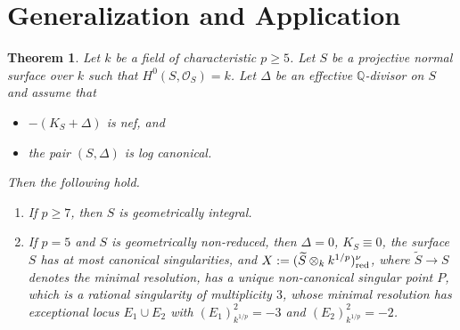 \documentclass[reqno,oneside]{amsart}
\newtheorem{theorem}{Theorem}[section]
\theoremstyle{definition}
\theoremstyle{plain}
\numberwithin{equation}{section}
\begin{document}
\section{Generalization and Application}\label{section-application}
\begin{theorem}\label{theorem-geo-int-log-pair}
  Let $k$ be a field of characteristic $p\ge 5$.
  Let $S$ be a projective normal surface over $k$ such that $H^0(S,\mathcal{O}_S) = k$.
  Let $\Delta$ be an effective $\mathbb Q$-divisor on $S$ and assume that
  \begin{itemize}
    \item $-(K_S + \Delta)$ is nef, and
    \item the pair $(S,\Delta)$ is log canonical.
  \end{itemize}
  Then the following hold.
  \begin{enumerate}[\rm(1)]
    \item If $p\ge7$, then $S$ is geometrically integral.
    \item If $p=5$ and $S$ is geometrically non-reduced, then $\Delta=0$, $K_S\equiv 0$, the surface $S$ has at most canonical singularities, and $X:=(\widetilde S\otimes_{k} k^{1/p})_{\rm red}^{\nu}$, where $\widetilde S\to S$ denotes the minimal resolution, has a unique non-canonical singular point $P$,
      which is a rational singularity of multiplicity $3$, whose minimal resolution has exceptional locus $E_1 \cup E_2$ with $(E_1 )^2_{k^{1/p}} = -3$ and $(E_2 )^2_{k^{1/p}} = -2$.
  \end{enumerate}
\end{theorem}
\end{document}
